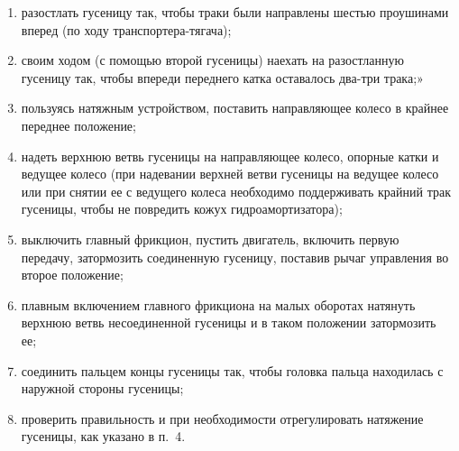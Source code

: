 \begin{enumerate}
        \begin{enumerate}
            \item разостлать гусеницу так, чтобы траки были направлены шестью проушинами вперед (по ходу транспортера-тягача); 
            \item своим ходом (с помощью второй гусеницы) наехать на разостланную гусеницу так, чтобы впереди переднего катка оставалось два-три трака;» 
            \item пользуясь натяжным устройством, поставить направляющее колесо в крайнее переднее положение; 
            \item надеть верхнюю ветвь гусеницы на направляющее колесо, опорные катки и ведущее колесо (при надевании верхней ветви гусеницы на ведущее колесо или при снятии ее с ведущего колеса необходимо поддерживать крайний трак гусеницы, чтобы не повредить кожух гидроамортизатора); 
            \item выключить главный фрикцион, пустить двигатель, включить первую передачу, затормозить соединенную гусеницу, поставив рычаг управления во второе положение; 
            \item плавным включением главного фрикциона на малых оборотах натянуть верхнюю ветвь несоединенной гусеницы и в таком положении затормозить ее; 
            \item соединить пальцем концы гусеницы так, чтобы головка пальца находилась с наружной стороны гусеницы; 
            \item проверить правильность и при необходимости отрегулировать натяжение гусеницы, как указано в п.~4.  
        \end{enumerate}
\end{enumerate}
